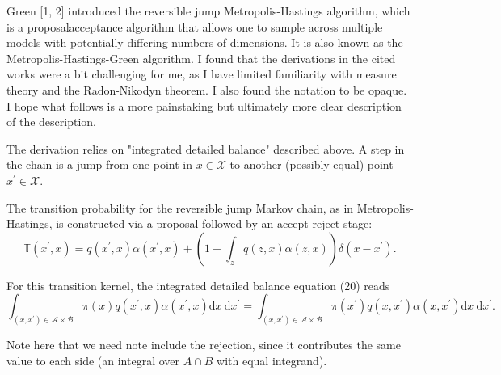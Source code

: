 \documentclass[11pt]{article}
\begin{document}
Green [1, 2] introduced the reversible jump Metropolis-Hastings algorithm, which is a proposalacceptance algorithm that allows one to sample across multiple models with potentially differing numbers of dimensions. It is also known as the Metropolis-Hastings-Green algorithm. I found that the derivations in the cited works were a bit challenging for me, as I have limited familiarity with measure theory and the Radon-Nikodyn theorem. I also found the notation to be opaque. I hope what follows is a more painstaking but ultimately more clear description of the description.

The derivation relies on "integrated detailed balance" described above. A step in the chain is a jump from one point in $x \in \mathcal{X}$ to another (possibly equal) point $x^{\prime} \in \mathcal{X}$.

The transition probability for the reversible jump Markov chain, as in Metropolis-Hastings, is constructed via a proposal followed by an accept-reject stage:
\begin{equation}
\mathbb{T}\left(x^{\prime}, x\right)=q\left(x^{\prime}, x\right) \alpha\left(x^{\prime}, x\right)+\left(1-\int_{z} q(z, x) \alpha(z, x)\right) \delta\left(x-x^{\prime}\right) .
\end{equation}

For this transition kernel, the integrated detailed balance equation (20) reads
\begin{equation}
\int_{\left(x, x^{\prime}\right) \in \mathcal{A} \times \mathcal{B}} \pi(x) q\left(x^{\prime}, x\right) \alpha\left(x^{\prime}, x\right) \mathrm{d} x \mathrm{~d} x^{\prime}=\int_{\left(x, x^{\prime}\right) \in \mathcal{A} \times \mathcal{B}} \pi\left(x^{\prime}\right) q\left(x, x^{\prime}\right) \alpha\left(x, x^{\prime}\right) \mathrm{d} x \mathrm{~d} x^{\prime} .
\end{equation}

Note here that we need note include the rejection, since it contributes the same value to each side (an integral over $A \cap B$ with equal integrand).
\end{document}
